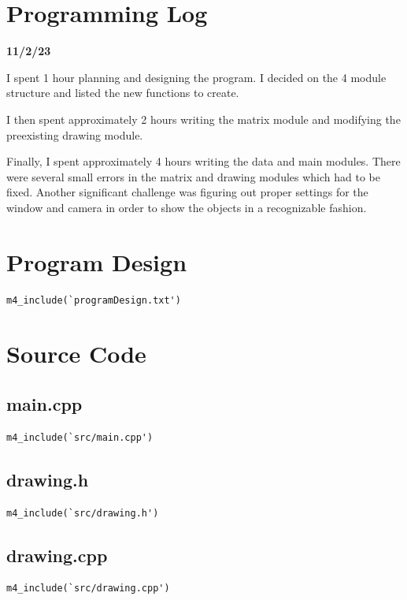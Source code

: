 \documentclass[12pt]{article}
\begin{document}
\section{Programming Log}

\noindent\textbf{11/2/23}

I spent 1 hour planning and designing the program.
I decided on the 4 module structure and listed the new functions to create.

I then spent approximately 2 hours writing the matrix module and modifying
the preexisting drawing module. 

Finally, I spent approximately 4 hours writing the data and main modules.
There were several small errors in the matrix and drawing modules which had to be fixed.
Another significant challenge was figuring out proper settings for the window and camera in order
to show the objects in a recognizable fashion.

\section{Program Design}

\begin{verbatim}
m4_include(`programDesign.txt')
\end{verbatim}

\section{Source Code}

\subsection{main.cpp}
\begin{verbatim}
m4_include(`src/main.cpp')
\end{verbatim}

\subsection{drawing.h}
\begin{verbatim}
m4_include(`src/drawing.h')
\end{verbatim}
\subsection{drawing.cpp}
\begin{verbatim}
m4_include(`src/drawing.cpp')
\end{verbatim}
\end{document}
